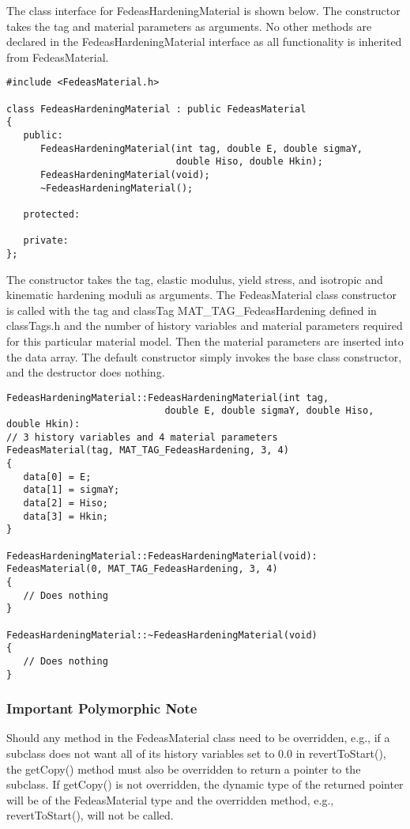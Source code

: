\documentclass[12pt]{article}
\begin{document}
{The class interface for FedeasHardeningMaterial is shown below.
The constructor takes the tag and material parameters as arguments. No other methods
are declared in the FedeasHardeningMaterial interface as all functionality
is inherited from FedeasMaterial.

{\sf\small
\begin{verbatim}
#include <FedeasMaterial.h>

class FedeasHardeningMaterial : public FedeasMaterial
{
   public:
      FedeasHardeningMaterial(int tag, double E, double sigmaY,
                              double Hiso, double Hkin);
      FedeasHardeningMaterial(void);
      ~FedeasHardeningMaterial();

   protected:

   private:
};
\end{verbatim}
}

\noindent The constructor takes the tag, elastic modulus, yield stress, and isotropic and
kinematic hardening moduli as arguments. The FedeasMaterial class constructor is
called with the tag and classTag MAT\_TAG\_FedeasHardening defined in classTags.h
and the number of history variables and material parameters required for this
particular material model. Then the material parameters are inserted into the data array.
The default constructor simply invokes the base class constructor, and the destructor
does nothing.

{\sf\small
\begin{verbatim}
FedeasHardeningMaterial::FedeasHardeningMaterial(int tag,
                            double E, double sigmaY, double Hiso, double Hkin):
// 3 history variables and 4 material parameters
FedeasMaterial(tag, MAT_TAG_FedeasHardening, 3, 4)
{
   data[0] = E;
   data[1] = sigmaY;
   data[2] = Hiso;
   data[3] = Hkin;
}

FedeasHardeningMaterial::FedeasHardeningMaterial(void):
FedeasMaterial(0, MAT_TAG_FedeasHardening, 3, 4)
{
   // Does nothing
}

FedeasHardeningMaterial::~FedeasHardeningMaterial(void)
{
   // Does nothing
}
\end{verbatim}
}

\subsubsection{Important Polymorphic Note}
Should any method in the FedeasMaterial class need to be overridden, e.g., if a
subclass does not want all of its history variables set to $0.0$ in revertToStart(),
the getCopy() method must also be overridden to return a pointer to the
subclass. If getCopy() is not overridden, the dynamic type of the returned
pointer will be of the FedeasMaterial type and the overridden method, e.g.,
revertToStart(), will not be called.

}
\end{document}
